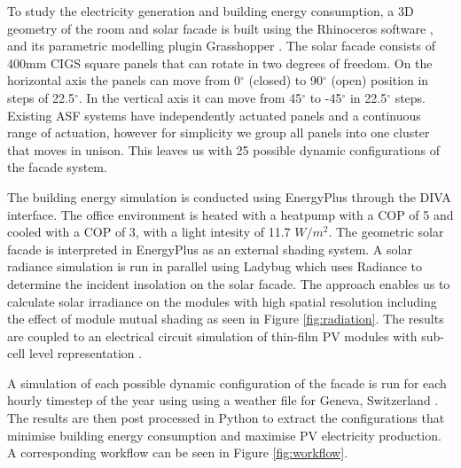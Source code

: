
To study the electricity generation and building energy consumption, a 3D geometry of the room and solar facade is built using the Rhinoceros software \cite{Rhino}, and its parametric modelling plugin Grasshopper \cite{grasshopper}. The solar facade consists of 400mm CIGS square panels that can rotate in two degrees of freedom. On the horizontal axis the panels can move from 0$^{\circ}$ (closed) to 90$^{\circ}$ (open) position in steps of 22.5$^{\circ}$. In the vertical axis it can move from 45$^{\circ}$ to -45$^{\circ}$ in 22.5$^{\circ}$ steps. Existing ASF systems \cite{nagy2015frontiers} have independently actuated panels and a continuous range of actuation, however for simplicity we group all panels into one cluster that moves in unison. This leaves us with 25 possible dynamic configurations of the facade system. 

The building energy simulation is conducted using EnergyPlus \cite{energyplus} through the DIVA \cite{DIVA} interface. The office environment is heated with a heatpump with a COP of 5 and cooled with a COP of 3, with a light intesity of 11.7 $W/m^2$.  The geometric solar facade is interpreted in EnergyPlus as an external shading system. A solar radiance simulation is run in parallel using Ladybug \cite{roudsari2014ladybug}  which uses Radiance \cite{ward1994radiance} to determine the incident insolation on the solar facade. The approach enables us to calculate solar irradiance on the modules with high spatial resolution including the effect of module mutual shading as seen in Figure \ref{fig:radiation}. The results are coupled to an electrical circuit simulation of thin-film PV modules with sub-cell level representation \cite{hofer2015PVSEC}.

A simulation of each possible dynamic configuration of the facade is run for each hourly timestep of the year using using a weather file for Geneva, Switzerland \cite{genevaweatherfile}. The results are then post processed in Python \cite{python} to extract the configurations that minimise building energy consumption and maximise PV electricity production. A corresponding workflow can be seen in Figure \ref{fig:workflow}. 




